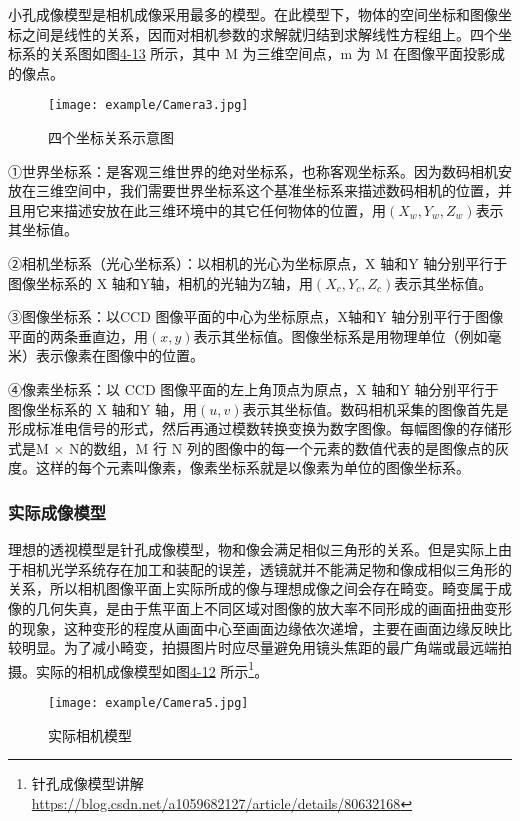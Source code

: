 小孔成像模型是相机成像采用最多的模型。在此模型下，物体的空间坐标和图像坐标之间是线性的关系，因而对相机参数的求解就归结到求解线性方程组上。四个坐标系的关系图如图\href{fig:4-13}{4-13} 所示，其中 M 为三维空间点，m 为 M 在图像平面投影成的像点。
\begin{figure}[!htp]
\centering
\texttt{[image: example/Camera3.jpg]}
\caption{四个坐标关系示意图}
\label{fig1:4-11}
\end{figure}

①世界坐标系：是客观三维世界的绝对坐标系，也称客观坐标系。因为数码相机安放在三维空间中，我们需要世界坐标系这个基准坐标系来描述数码相机的位置，并且用它来描述安放在此三维环境中的其它任何物体的位置，用$(X_w,Y_w,Z_w)$表示其坐标值。

②相机坐标系（光心坐标系）：以相机的光心为坐标原点，X 轴和Y 轴分别平行于图像坐标系的 X 轴和Y轴，相机的光轴为Z轴，用$(X_c,Y_c,Z_c)$表示其坐标值。

③图像坐标系：以CCD 图像平面的中心为坐标原点，X轴和Y 轴分别平行于图像平面的两条垂直边，用$(x,y)$表示其坐标值。图像坐标系是用物理单位（例如毫米）表示像素在图像中的位置。

④像素坐标系：以 CCD 图像平面的左上角顶点为原点，X 轴和Y 轴分别平行于图像坐标系的 X 轴和Y 轴，用$(u,v)$表示其坐标值。数码相机采集的图像首先是形成标准电信号的形式，然后再通过模数转换变换为数字图像。每幅图像的存储形式是M $\times$ N的数组，M 行 N 列的图像中的每一个元素的数值代表的是图像点的灰度。这样的每个元素叫像素，像素坐标系就是以像素为单位的图像坐标系。

\subsubsection{实际成像模型}

理想的透视模型是针孔成像模型，物和像会满足相似三角形的关系。但是实际上由于相机光学系统存在加工和装配的误差，透镜就并不能满足物和像成相似三角形的关系，所以相机图像平面上实际所成的像与理想成像之间会存在畸变。畸变属于成像的几何失真，是由于焦平面上不同区域对图像的放大率不同形成的画面扭曲变形的现象，这种变形的程度从画面中心至画面边缘依次递增，主要在画面边缘反映比较明显。为了减小畸变，拍摄图片时应尽量避免用镜头焦距的最广角端或最远端拍摄。实际的相机成像模型如图\href{fig:4-12}{4-12} 所示\footnote{针孔成像模型讲解 \quad \url{https://blog.csdn.net/a1059682127/article/details/80632168}}。
\begin{figure}[!htp]
\centering
\texttt{[image: example/Camera5.jpg]}
\caption{实际相机模型}
\label{fig1:4-12}
\end{figure}

